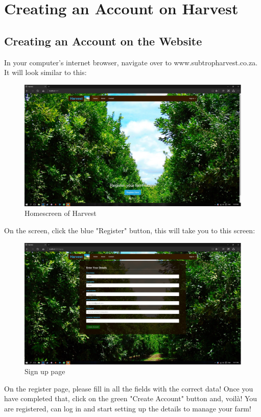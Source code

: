 \documentclass[11pt,fleqn]{book} %
\begin{document}
	\section{Creating an Account on Harvest}
		\subsection{Creating an Account on the Website}
			In your computer's internet browser, navigate over to www.subtropharvest.co.za. It will look similar to this:
			\begin{figure}[H]
				\includegraphics[scale=0.25]{Pictures/homescreen.jpg}\centering
				\caption{Homescreen of Harvest}
			\end{figure}
			On the screen, click the blue "Register" button, this will take you to this screen:
			\begin{figure}[H]
				\includegraphics[scale=0.25]{Pictures/signup.jpg}\centering
				\caption{Sign up page}
			\end{figure}
			On the register page, please fill in all the fields with the correct data! Once you have completed that, click on the green "Create Account" button and, voilà! You are registered, can log in and start setting up the details to manage your farm!
\end{document}
